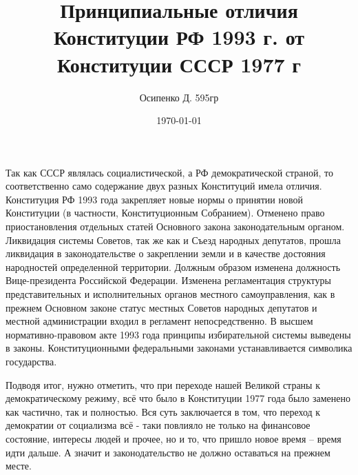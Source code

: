 \documentclass[a4paper, 12pt]{article}
\title{Принципиальные отличия Конституции РФ 1993 г. от Конституции СССР 1977 г}
\author{Осипенко Д. 595гр}
\date{\today}
\begin{document}
\sffamily
\maketitle
Так как СССР являлась социалистической, а РФ демократической страной, то соответственно само содержание двух разных Конституций имела отличия. Конституция РФ 1993 года закрепляет новые нормы о принятии новой Конституции (в частности, Конституционным Собранием). Отменено право приостановления отдельных статей Основного закона законодательным органом. Ликвидация системы Советов, так же как и Съезд народных депутатов, прошла ликвидация в законодательстве о закреплении земли и в качестве достояния народностей определенной территории. Должным образом изменена должность Вице-президента Российской Федерации. Изменена регламентация структуры представительных и исполнительных органов местного самоуправления, как в прежнем Основном законе статус местных Советов народных депутатов и местной администрации входил в регламент непосредственно. В высшем нормативно-правовом акте 1993 года принципы избирательной системы выведены в законы. Конституционными федеральными законами устанавливается символика государства.

Подводя итог, нужно отметить, что при переходе нашей Великой страны к демократическому режиму, всё что было в Конституции 1977 года было заменено как частично, так и полностью. Вся суть заключается в том, что переход к демократии от социализма всё - таки повлияло не только на финансовое состояние, интересы людей и прочее, но и то, что пришло новое время – время идти дальше. А значит и законодательство не должно оставаться на прежнем месте.
\end{document}
